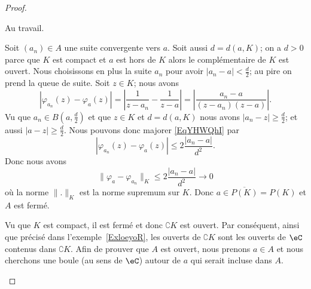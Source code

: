 \begin{proof}
\begin{subproof}
		Au travail.

		Soit \( (a_n)\in A\) une suite convergente vers \( a\). Soit aussi \( d=d(a,K)\); on a \( d>0\) parce que \( K\) est compact et \( a\) est hors de \( K\) alors le complémentaire de \( K\) est ouvert. Nous choisissons en plus la suite \( a_n\) pour avoir \( | a_n-a |<\frac{ d }{2}\); au pire on prend la queue de suite. Soit \( z\in K\); nous avons
		\begin{equation}    \label{EqYHWQhI}
			| \varphi_{a_n}(z)-\varphi_a(z) |=\left| \frac{1}{ z-a_n }-\frac{1}{ z-a } \right| =  \left| \frac{ a_n-a }{ (z-a_n)(z-a) } \right|.
		\end{equation}
		Vu que \( a_n\in B(a,\frac{ d }{2})\) et que \( z\in K\) et \( d=d(a,K)\) nous avons \( | a_n-z |\geq \frac{ d }{2}\); et aussi \( | a-z |\geq \frac{ d }{2}\). Nous pouvons donc majorer \eqref{EqYHWQhI} par
		\begin{equation}
			| \varphi_{a_n}(z)-\varphi_a(z) |\leq 2\frac{ | a_n-a | }{ d^2 }.
		\end{equation}
		Donc nous avons
		\begin{equation}
			\| \varphi_a-\varphi_{a_n} \|_K\leq 2\frac{ | a_n-a | }{ d^2 }\to 0
		\end{equation}
		où la norme \( \| . \|_K\) est la norme supremum sur \( K\). Donc \( a\in \overline{ P(K) }=P(K)\) et \( A\) est fermé.

		\spitem[Ouvert] Vu que \( K\) est compact, il est fermé et donc \( \complement K\) est ouvert. Par conséquent, ainsi que précisé dans l'exemple~\ref{ExloeyoR}, les ouverts de \( \complement K\) sont les ouverts de \( \eC\) contenus dans \( \complement K\). Afin de prouver que \( A\) est ouvert, nous prenons  \( a\in A\) et nous cherchons une boule (au sens de \( \eC\)) autour de \( a\) qui serait incluse dans \( A\).


\end{subproof}
\end{proof}
